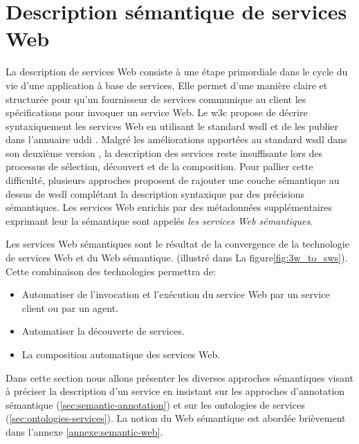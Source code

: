\section{Description sémantique de services Web}
\label{sec:ws-description}
La description de services Web consiste à une étape primordiale dans
le cycle du vie d'une application à base de services, Elle permet
d'une manière claire et structurée pour qu'un fournisseur de services
communique au client les spécifications pour invoquer un service
Web. Le \acrshort{w3c} propose de décrire syntaxiquement les services
Web en utilisant le standard \acrshort{wsdl} \cite{christensen2001web,
  chinnici2007web} et de les publier dans l'annuaire \acrshort{uddi}
\cite{clement2004uddi}. Malgré les améliorations apportées au standard
\acrshort{wsdl} dans son deuxième version \cite{chinnici2007web}, la
description des services reste insuffisante lors des processus de
sélection, découvert et de la composition. Pour pallier cette
difficulté, plusieurs approches
\cite{sivashanmugam2003adding,mcilraith2001semantic,
  mcilraith2003bringing, fensel2002web, paolucci2002semantic}
proposent de rajouter une couche sémantique au dessus de
\acrshort{wsdl} complétant la description syntaxique par des
précisions sémantiques. Les services Web enrichis par des métadonnées
supplémentaires exprimant leur la sémantique sont appelés \textit{les
  services Web sémantiques}.\medskip



Les services Web sémantiques sont le résultat de la convergence de la
technologie de services Web et du Web
sémantique. \cite{bartalos2011effective}(illustré dans La
figure\ref{fig:3w_to_sws}). Cette combinaison des technologies
permettra de:

\begin{itemize}\renewcommand\labelitemi{--}
\item Automatiser de l'invocation et l'exécution du service Web par un
  service client ou par un agent.

\item Automatiser la découverte de services.

\item La composition automatique des services Web.
\end{itemize}

Dans cette section nous allons présenter les diverses approches
sémantiques visant à préciser la description d'un service en insistant
sur les approches d'annotation sémantique
(\ref{sec:semantic-annotation}) et sur les ontologies de services
(\ref{sec:ontologies-services}). La notion du Web sémantique est
abordée brièvement dans l'annexe \ref{annexe:semantic-web}.

